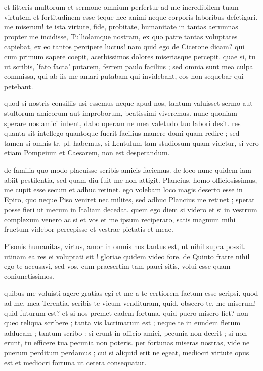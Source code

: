 


 et litteris multorum et sermone omnium perfertur ad me incredibilem tuam virtutem et fortitudinem esse teque nec animi neque corporis laboribus defetigari. me miserum! te ista virtute, fide, probitate, humanitate in tantas aerumnas propter me incidisse, Tulliolamque nostram, ex quo patre tantas voluptates capiebat, ex eo tantos percipere luctus! nam quid ego de Cicerone dicam? qui cum primum sapere coepit, acerbissimos dolores miseriasque percepit. quae si, tu ut scribis, 'fato facta' putarem, ferrem paulo facilius ; sed omnia sunt mea culpa commissa, qui ab iis me amari putabam qui invidebant, eos non sequebar qui petebant.

 quod si nostris consiliis usi essemus neque apud nos, tantum valuisset sermo aut stultorum amicorum aut improborum, beatissimi viveremus. nunc quoniam sperare nos amici iubent, dabo operam ne mea valetudo tuo labori desit. res quanta sit intellego quantoque fuerit facilius manere domi quam redire ; sed tamen si omnis tr. pl. habemus, si Lentulum tam studiosum quam videtur, si vero etiam Pompeium et Caesarem, non est desperandum.

 de familia quo modo placuisse scribis amicis faciemus. de loco nunc quidem iam abiit pestilentia, sed quam diu fuit me non attigit. Plancius, homo officiosissimus, me cupit esse secum et adhuc retinet. ego volebam loco magis deserto esse in Epiro, quo neque Piso veniret nec milites, sed adhuc Plancius me retinet ; sperat posse fieri ut mecum in Italiam decedat. quem ego diem si videro et si in vestrum complexum venero ac si et vos et me ipsum reciperaro, satis magnum mihi fructum videbor percepisse et vestrae pietatis et meae.

 Pisonis humanitas, virtus, amor in omnis nos tantus est, ut nihil supra possit. utinam ea res ei voluptati sit ! gloriae quidem video fore. de Quinto fratre nihil ego te accusavi, sed vos, cum praesertim tam pauci sitis, volui esse quam coniunctissimos.

 quibus me voluisti agere gratias egi et me a te certiorem factum esse scripsi. quod ad me, mea Terentia, scribis te vicum vendituram, quid, obsecro te, me miserum! quid futurum est? et si nos premet eadem fortuna, quid puero misero fiet? non queo reliqua scribere ; tanta vis lacrimarum est ; neque te in eundem fletum adducam ; tantum scribo : si erunt in officio amici, pecunia non deerit ; si non erunt, tu efficere tua pecunia non poteris. per fortunas miseras nostras, vide ne puerum perditum perdamus ; cui si aliquid erit ne egeat, mediocri virtute opus est et mediocri fortuna ut cetera consequatur.

